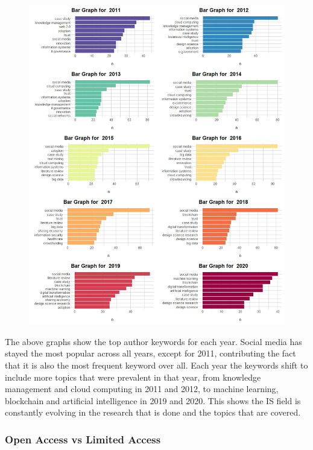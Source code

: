\documentclass[
  letterpaper,
  DIV=11,
  numbers=noendperiod]{scrartcl}
\begin{document}
\begin{figure}

\includegraphics[width=5.72917in,height=\textheight]{images/bargraphbyyearAuthor-01.jpg} \hfill{}

\end{figure}

The above graphs show the top author keywords for each year. Social
media has stayed the most popular across all years, except for 2011,
contributing the fact that it is also the most frequent keyword over
all. Each year the keywords shift to include more topics that were
prevalent in that year, from knowledge management and cloud computing in
2011 and 2012, to machine learning, blockchain and artificial
intelligence in 2019 and 2020. This shows the IS field is constantly
evolving in the research that is done and the topics that are covered.

\hypertarget{open-access-vs-limited-access}{%
\subsubsection{Open Access vs Limited
Access}\label{open-access-vs-limited-access}}
\end{document}
